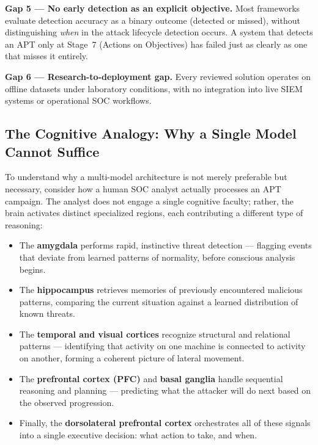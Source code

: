 \textbf{Gap 5 --- No early detection as an explicit objective.}
Most frameworks evaluate detection accuracy as a binary outcome (detected or missed), without distinguishing \textit{when} in the attack lifecycle detection occurs. A system that detects an APT only at Stage~7 (Actions on Objectives) has failed just as clearly as one that misses it entirely.

\textbf{Gap 6 --- Research-to-deployment gap.}
Every reviewed solution operates on offline datasets under laboratory conditions, with no integration into live SIEM systems or operational SOC workflows.

\subsection{The Cognitive Analogy: Why a Single Model Cannot Suffice}

To understand why a multi-model architecture is not merely preferable but necessary, consider how a human SOC analyst actually processes an APT campaign. The analyst does not engage a single cognitive faculty; rather, the brain activates distinct specialized regions, each contributing a different type of reasoning:

\begin{itemize}
    \item The \textbf{amygdala} performs rapid, instinctive threat detection --- flagging events that deviate from learned patterns of normality, before conscious analysis begins.
    \item The \textbf{hippocampus} retrieves memories of previously encountered malicious patterns, comparing the current situation against a learned distribution of known threats.
    \item The \textbf{temporal and visual cortices} recognize structural and relational patterns --- identifying that activity on one machine is connected to activity on another, forming a coherent picture of lateral movement.
    \item The \textbf{prefrontal cortex (PFC)} and \textbf{basal ganglia} handle sequential reasoning and planning --- predicting what the attacker will do next based on the observed progression.
    \item Finally, the \textbf{dorsolateral prefrontal cortex} orchestrates all of these signals into a single executive decision: what action to take, and when.
\end{itemize}


